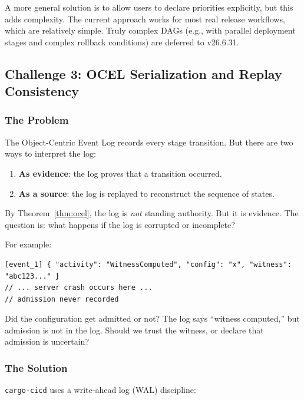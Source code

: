 A more general solution is to allow users to declare priorities explicitly, but this adds complexity. The current approach works for most real release workflows, which are relatively simple. Truly complex DAGs (e.g., with parallel deployment stages and complex rollback conditions) are deferred to v26.6.31.

\subsection{Challenge 3: OCEL Serialization and Replay Consistency}

\subsubsection{The Problem}

The Object-Centric Event Log records every stage transition. But there are two ways to interpret the log:

\begin{enumerate}
  \item \textbf{As evidence}: the log proves that a transition occurred.
  \item \textbf{As a source}: the log is replayed to reconstruct the sequence of states.
\end{enumerate}

By Theorem~\ref{thm:ocel}, the log is \emph{not} standing authority. But it is evidence. The question is: what happens if the log is corrupted or incomplete?

For example:

\begin{lstlisting}[caption={Incomplete OCEL: witness computed but admission not recorded}]
[event_1] { "activity": "WitnessComputed", "config": "x", "witness": "abc123..." }
// ... server crash occurs here ...
// admission never recorded
\end{lstlisting}

Did the configuration get admitted or not? The log says ``witness computed,'' but admission is not in the log. Should we trust the witness, or declare that admission is uncertain?

\subsubsection{The Solution}

\texttt{cargo-cicd} uses a write-ahead log (WAL) discipline:


